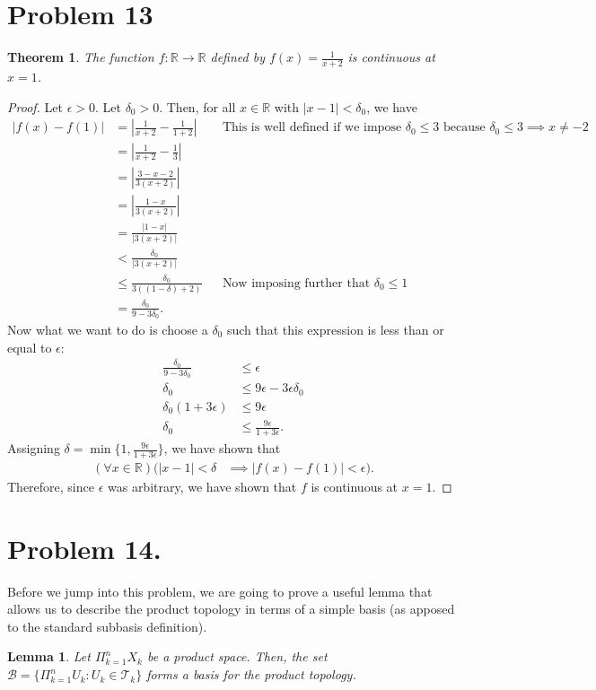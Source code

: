 \documentclass[10pt,a4paper]{article}
\author{Jeremiah Givens}
\theoremstyle{theorem}
\newtheorem{theorem}{Theorem}
\newtheorem{lemma}{Lemma}
\theoremstyle{definition}
\newcommand{\Tau}{\mathcal{T}}
\begin{document}
\section*{Problem 13}
\begin{theorem}
The function $f:\mathbb{R} \to \mathbb{R}$ defined by $f(x) = \frac{1}{x + 2}$ is continuous at $x = 1$.
\end{theorem}

\begin{proof}
Let $\epsilon >0$.  Let $\delta_0 >0$.  Then, for all $x \in \mathbb{R}$ with $|x - 1| < \delta_0$, we have
\begin{align*}
|f(x) -f(1)| &= |\frac{1}{x + 2} - \frac{1}{1 + 2}| && \text{This is well defined if we impose } \delta_0 \leq 3 \text{ because } \delta_0 \leq3 \implies x \not = -2\\
&= |\frac{1}{x + 2} - \frac{1}{3}| \\
&= |\frac{3 - x - 2}{3(x + 2)}| \\
&= |\frac{1 - x}{3(x + 2)}| \\
&= \frac{|1 - x|}{|3(x + 2)|} \\
&< \frac{\delta_0}{|3(x + 2)|} \\
&\leq \frac{\delta_0}{3((1 - \delta) + 2)} &&\text{Now imposing further that } \delta_0 \leq 1\\
&= \frac{\delta_0}{9 - 3\delta_0}.
\end{align*}
Now what we want to do is choose a $\delta_0$ such that this expression is less than or equal to $\epsilon$:
\begin{align*}
\frac{\delta_0}{9 - 3\delta_0} &\leq \epsilon\\
\delta_0 &\leq 9 \epsilon - 3 \epsilon \delta_0\\
\delta_0(1 + 3 \epsilon) &\leq 9 \epsilon\\
\delta_0 &\leq \frac{9 \epsilon}{1 + 3 \epsilon}.
\end{align*}
Assigning $\delta = \min\{1, \frac{9 \epsilon}{1 + 3 \epsilon} \}$, we have shown that
\begin{align*}
(\forall x \in \mathbb{R})(|x - 1| < \delta &\implies |f(x) - f(1)| < \epsilon).
\end{align*}
Therefore,  since $\epsilon$ was arbitrary, we have shown that $f$ is continuous at $x = 1$.
\end{proof}

\section*{Problem 14.}
Before we jump into this problem, we are going to prove a useful lemma that allows us to describe the product topology in terms of a simple basis (as apposed to the standard subbasis definition).
\begin{lemma}
Let $\Pi_{k=1}^{n} X_k$ be a product space. Then, the set $\mathcal{B} = \{\Pi_{k=1}^{n} U_k : U_k \in \Tau_k\}$ forms a basis for the product topology. 
\end{lemma}
\end{document}
